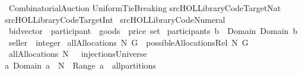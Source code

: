 %
\begin{isabellebody}%
\def\isabellecontext{CombinatorialAuction}%
%
\isamarkuptrue%
%
\isadelimtheory
%
\endisadelimtheory
%
\isatagtheory
{}\isamarkupfalse%
\ CombinatorialAuction\isanewline
\isanewline
{}\isanewline
\isanewline
UniformTieBreaking\isanewline
{\isachardoublequoteopen}{\isachartilde}{\isachartilde}{\isacharslash}src{\isacharslash}HOL{\isacharslash}Library{\isacharslash}Code{\isacharunderscore}Target{\isacharunderscore}Nat{\isachardoublequoteclose}\ \isanewline
{\isachardoublequoteopen}{\isachartilde}{\isachartilde}{\isacharslash}src{\isacharslash}HOL{\isacharslash}Library{\isacharslash}Code{\isacharunderscore}Target{\isacharunderscore}Int{\isachardoublequoteclose}\ \isanewline
\isanewline
{\isachardoublequoteopen}{\isachartilde}{\isachartilde}{\isacharslash}src{\isacharslash}HOL{\isacharslash}Library{\isacharslash}Code{\isacharunderscore}Numeral{\isachardoublequoteclose}\isanewline
\isanewline
{}%
\endisatagtheory
{\isafoldtheory}%
%
\isadelimtheory
%
\endisadelimtheory
%
\isamarkuptrue%
\isamarkupfalse%
\ bidvector{\isacharprime}\ {\isacharequal}\ {\isachardoublequoteopen}{\isacharparenleft}{\isacharparenleft}participant\ {\isasymtimes}\ goods{\isacharparenright}\ {\isasymtimes}\ price{\isacharparenright}\ set{\isachardoublequoteclose}\isanewline
{}\isamarkupfalse%
\ {\isachardoublequoteopen}participants\ b{\isacharprime}\ {\isacharequal}{\isacharequal}\ Domain\ {\isacharparenleft}Domain\ b{\isacharprime}{\isacharparenright}{\isachardoublequoteclose}\isanewline
{}\isamarkupfalse%
\ {\isachardoublequoteopen}seller\ {\isacharequal}{\isacharequal}\ {\isacharparenleft}{}{\isacharcolon}{\isacharcolon}integer{\isacharparenright}{\isachardoublequoteclose}\isanewline
{}\isamarkupfalse%
\ {\isachardoublequoteopen}allAllocations\ N\ G\ {\isacharequal}{\isacharequal}\ possibleAllocationsRel\ N\ G{\isachardoublequoteclose}\isanewline
{}\isamarkupfalse%
\ {\isachardoublequoteopen}allAllocations{\isacharprime}\ N\ {\isasymOmega}\ {\isacharequal}{\isacharequal}\ injectionsUniverse\ {\isasyminter}\ \isanewline
{\isacharbraceleft}a{\isachardot}\ Domain\ a\ {\isasymsubseteq}\ N\ {\isacharampersand}\ Range\ a\ {\isasymin}\ all{\isacharunderscore}partitions\ {\isasymOmega}{\isacharbraceright}{\isachardoublequoteclose}\ \isanewline

\end{isabellebody}
